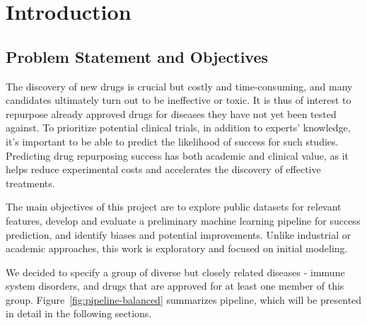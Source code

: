 \section{Introduction}

\subsection{Problem Statement and Objectives}

The discovery of new drugs is crucial but costly and
 time-consuming, and many candidates ultimately turn out to be ineffective or toxic. 
 It is thus of interest to repurpose already approved drugs for diseases
 they have not yet been tested against. To prioritize potential clinical trials, 
 in addition to experts' knowledge, it's important to be able to predict the likelihood of success 
 for such studies. Predicting drug repurposing success has both academic and clinical value,
  as it helps reduce experimental costs and accelerates the discovery of effective treatments.

 The main objectives of this project are to explore public datasets for relevant features,
develop and evaluate a preliminary machine learning pipeline for success prediction, and identify biases 
and potential improvements. Unlike industrial or academic approaches, this work is exploratory and focused 
on initial modeling.

We decided to specify a group of diverse but closely related diseases - immune system disorders,
 and drugs that are approved for at least one member of this group. Figure~\ref{fig:pipeline-balanced} 
 summarizes pipeline, which will be presented in detail in the following sections.


